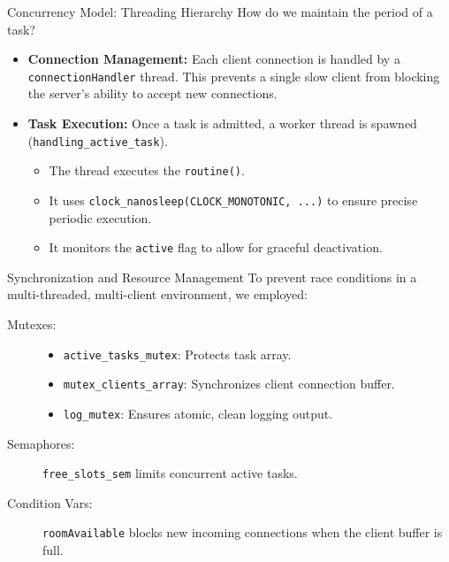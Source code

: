 \begin{frame}{Concurrency Model: Threading Hierarchy}
    How do we maintain the period of a task?
    \begin{itemize}
        \item \textbf{Connection Management:}
        Each client connection is handled by a \texttt{connectionHandler} thread. This prevents a single slow client from blocking the server's ability to accept new connections.
        
        \item \textbf{Task Execution:}
        Once a task is admitted, a worker thread is spawned (\texttt{handling\_active\_task}).
        \begin{itemize}
            \item The thread executes the \texttt{routine()}.
            \item It uses \texttt{clock\_nanosleep(CLOCK\_MONOTONIC, ...)} to ensure precise periodic execution.
            \item It monitors the \texttt{active} flag to allow for graceful deactivation.
        \end{itemize}
    \end{itemize}
\end{frame}

\begin{frame}{Synchronization and Resource Management}
To prevent race conditions in a multi-threaded, multi-client environment, we employed:

   \begin{description}
        \item[Mutexes:]
            \begin{itemize}
                \item \texttt{active\_tasks\_mutex}: Protects task array.
                \item \texttt{mutex\_clients\_array}: Synchronizes client connection buffer.
                \item \texttt{log\_mutex}: Ensures atomic, clean logging output.
            \end{itemize}
        \item[Semaphores:] \texttt{free\_slots\_sem} limits concurrent active tasks.
        \item[Condition Vars:] \texttt{roomAvailable} blocks new incoming connections when the client buffer is full.
    \end{description}
\end{frame}


